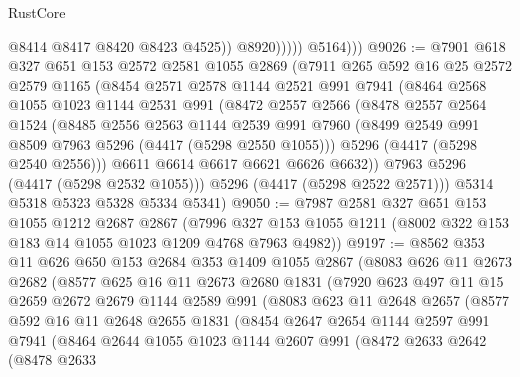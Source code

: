 \begin{lexlean}{RustCore}
\begin{coremodule}
                        @8414
                        @8417
                        @8420
                        @8423
                        @4525))
                    @8920)))))
          @5164)))
@9026 := @7901
    @618
    @327
    @651
    @153
    @2572
    @2581
    @1055
    @2869
    (@7911
      @265
      @592
      @16
      @25
      @2572
      @2579
      @1165
      (@8454
        @2571
        @2578
        @1144
        @2521
        @991
        @7941
        (@8464
          @2568
          @1055
          @1023
          @1144
          @2531
          @991
          (@8472
            @2557
            @2566
            (@8478
              @2557
              @2564
              @1524
              (@8485
                @2556
                @2563
                @1144
                @2539
                @991
                @7960
                (@8499 @2549 @991 @8509 @7963 @5296 (@4417 (@5298 @2550 @1055)))
                @5296
                (@4417 (@5298 @2540 @2556)))
              @6611
              @6614
              @6617
              @6621
              @6626
              @6632))
          @7963
          @5296
          (@4417 (@5298 @2532 @1055)))
        @5296
        (@4417 (@5298 @2522 @2571)))
      @5314
      @5318
      @5323
      @5328
      @5334
      @5341)
@9050 := @7987
    @2581
    @327
    @651
    @153
    @1055
    @1212
    @2687
    @2867
    (@7996 @327 @153 @1055 @1211 (@8002 @322 @153 @183 @14 @1055 @1023 @1209 @4768 @7963 @4982))
@9197 := @8562
    @353
    @11
    @626
    @650
    @153
    @2684
    @353
    @1409
    @1055
    @2867
    (@8083
      @626
      @11
      @2673
      @2682
      (@8577
        @625
        @16
        @11
        @2673
        @2680
        @1831
        (@7920
          @623
          @497
          @11
          @15
          @2659
          @2672
          @2679
          @1144
          @2589
          @991
          (@8083
            @623
            @11
            @2648
            @2657
            (@8577
              @592
              @16
              @11
              @2648
              @2655
              @1831
              (@8454
                @2647
                @2654
                @1144
                @2597
                @991
                @7941
                (@8464
                  @2644
                  @1055
                  @1023
                  @1144
                  @2607
                  @991
                  (@8472
                    @2633
                    @2642
                    (@8478
                      @2633

\end{coremodule}
\end{lexlean}
